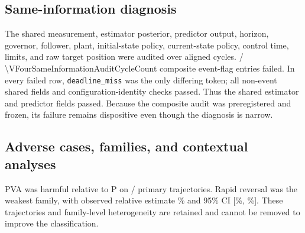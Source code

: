 \begin{table}[H]
  \centering
  \caption{Complete high-level disposition of the frozen V4 result.  The
  observed effect and all failed gates are shown together; the result is
  non-confirmatory.}
  \label{tab:v4-appendix-gates}
  \scriptsize
  
\end{table}

\subsection{Same-information diagnosis}

The shared measurement, estimator posterior, predictor output, horizon,
governor, follower, plant, initial-state policy, current-state policy, control
time, limits, and raw target position were audited over aligned cycles.
\VFourSameInformationFailureCount/
\num{\VFourSameInformationAuditCycleCount}{} composite event-flag entries
failed.  In every failed row, \texttt{deadline\_miss} was the only differing
token; all non-event shared fields and configuration-identity checks passed.
Thus the shared estimator and predictor fields passed.  Because the composite
audit was preregistered and frozen, its failure remains dispositive even
though the diagnosis is narrow.

\begin{table}[H]
  \centering
  \caption{All failed V4 same-information rows, generated from the bounded
  reviewer aid.  Each row differs only in the composite execution-time
  \texttt{deadline\_miss} token; the frozen gate remains failed.}
  \label{tab:v4-same-information-failures}
  \scriptsize
  
\end{table}

\subsection{Adverse cases, families, and contextual analyses}

PVA was harmful relative to P on
\VFourHarmfulCount/\VFourHarmfulDenominator{} primary trajectories.  Rapid
reversal was the weakest family, with observed relative estimate
\VFourRapidReversalRelativeImprovement\% and 95\% CI
[\VFourRapidReversalRelativeCILow\%,
\VFourRapidReversalRelativeCIHigh\%].  These trajectories and family-level
heterogeneity are retained and cannot be removed to improve the classification.

\begin{table}[H]
  \centering
  \caption{All frozen descriptive V4 family effects and the mechanically
  selected worst five trajectories.  Harmful rows and rapid-reversal
  heterogeneity remain part of the evidence; subgroups do not override the
  aggregate validity gate.}
  \label{tab:v4-family-effects}
  \scriptsize
  
\end{table}

